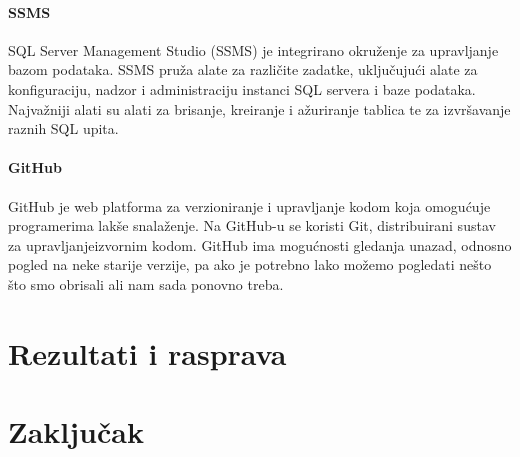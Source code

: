 \documentclass[diplomskirad]{fer}
\begin{document}
\subsubsection{SSMS}
SQL Server Management Studio (SSMS) je integrirano okruženje za upravljanje bazom podataka. SSMS pruža alate za različite zadatke, uključujući alate za konfiguraciju, nadzor i administraciju instanci SQL servera i baze podataka. Najvažniji alati su alati za brisanje, kreiranje i ažuriranje tablica te za izvršavanje raznih SQL upita. \cite{SSMS}
\subsubsection{GitHub}
GitHub je web platforma za verzioniranje i upravljanje kodom koja omogućuje programerima lakše snalaženje. Na GitHub-u se koristi Git, distribuirani sustav za upravljanjeizvornim kodom. GitHub ima mogućnosti gledanja unazad, odnosno pogled na neke starije verzije, pa ako je potrebno lako možemo pogledati nešto što smo obrisali ali nam sada ponovno treba. \cite{GIT}

\label{pog:glavni_dio}


\chapter{Rezultati i rasprava}
\label{pog:rezultati_i_rasprava}




\chapter{Zaključak}
\label{pog:zakljucak}








\end{document}
